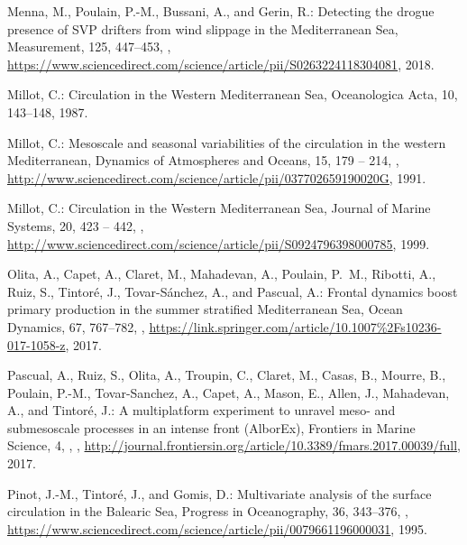 \documentclass[essd]{copernicus}
\begin{document}
\begin{thebibliography}{46}
Menna, M., Poulain, P.-M., Bussani, A., and Gerin, R.: {Detecting the drogue
  presence of SVP drifters from wind slippage in the Mediterranean Sea},
  Measurement, 125, 447–453, ,
  \urlprefix\url{https://www.sciencedirect.com/science/article/pii/S0263224118304081},
  2018.

Millot, C.: {Circulation in the Western Mediterranean Sea}, Oceanologica Acta,
  10, 143--148, 1987.

Millot, C.: {Mesoscale and seasonal variabilities of the circulation in the
  western Mediterranean}, Dynamics of Atmospheres and Oceans, 15, 179 -- 214,
  ,
  \urlprefix\url{http://www.sciencedirect.com/science/article/pii/037702659190020G},
  1991.

Millot, C.: Circulation in the Western Mediterranean Sea, Journal of Marine
  Systems, 20, 423 -- 442, ,
  \urlprefix\url{http://www.sciencedirect.com/science/article/pii/S0924796398000785},
  1999.

Olita, A., Capet, A., Claret, M., Mahadevan, A., Poulain, P.~M., Ribotti, A.,
  Ruiz, S., Tintor{\'e}, J., Tovar-S{\'a}nchez, A., and Pascual, A.: {Frontal
  dynamics boost primary production in the summer stratified Mediterranean
  Sea}, Ocean Dynamics, 67, 767--782, ,
  \urlprefix\url{https://link.springer.com/article/10.1007%2Fs10236-017-1058-z},
  2017.

Pascual, A., Ruiz, S., Olita, A., Troupin, C., Claret, M., Casas, B., Mourre,
  B., Poulain, P.-M., Tovar-Sanchez, A., Capet, A., Mason, E., Allen, J.,
  Mahadevan, A., and Tintor\'{e}, J.: {A multiplatform experiment to unravel
  meso- and submesoscale processes in an intense front (AlborEx)}, Frontiers in
  Marine Science, 4, {}, ,
  \urlprefix\url{http://journal.frontiersin.org/article/10.3389/fmars.2017.00039/full},
  2017.

Pinot, J.-M., Tintor\'{e}, J., and Gomis, D.: {Multivariate analysis of the
  surface circulation in the Balearic Sea}, Progress in Oceanography, 36,
  343–376, ,
  \urlprefix\url{https://www.sciencedirect.com/science/article/pii/0079661196000031},
  1995.


\end{thebibliography}
\end{document}
